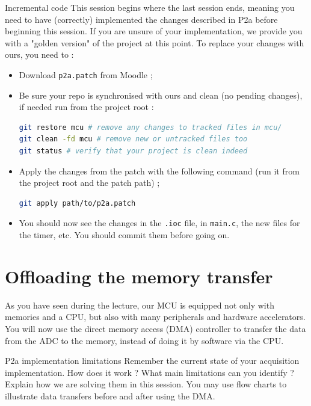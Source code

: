\begin{bclogo}[couleur = gray!20, arrondi = 0.2, logo=\bcattention]{Incremental code}
This session begins where the last session ends, meaning you need to have (correctly) implemented the changes described in P2a before beginning this session. If you are unsure of your implementation, we provide you with a "golden version" of the project at this point. To replace your changes with ours, you need to :
\begin{itemize}
    \item Download \texttt{p2a.patch} from Moodle ;
    \item Be sure your repo is synchronised with ours and clean (no pending changes), if needed run from the project root :
    \begin{lstlisting}[language=bash]
git restore mcu # remove any changes to tracked files in mcu/
git clean -fd mcu # remove new or untracked files too
git status # verify that your project is clean indeed
    \end{lstlisting}
    \item Apply the changes from the patch with the following command (run it from the project root and the patch path) ;
    \begin{lstlisting}[language=bash]
git apply path/to/p2a.patch
    \end{lstlisting}
    \item You should now see the changes in the \texttt{.ioc} file, in \texttt{main.c}, the new files for the timer, etc. You should commit them before going on.
\end{itemize}
\end{bclogo}

\section{Offloading the memory transfer}

As you have seen during the lecture, our MCU is equipped not only with memories and a CPU, but also with many peripherals and hardware accelerators. You will now use the direct memory access (DMA) controller to transfer the data from the ADC to the memory, instead of doing it by software via the CPU.

\begin{bclogo}[couleur = gray!20, arrondi = 0.2, logo=\bcquestion]{P2a implementation limitations}
Remember the current state of your acquisition implementation. How does it work ? What main limitations can you identify ? Explain how we are solving them in this session. You may use flow charts to illustrate data transfers before and after using the DMA.
\end{bclogo}

